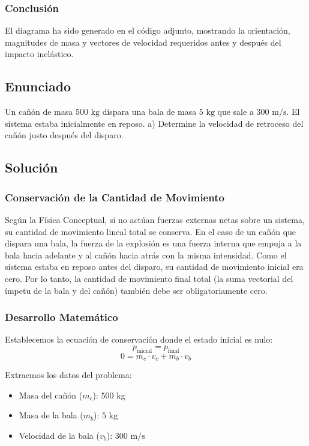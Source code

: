 \documentclass{article}
\begin{document}
\subsubsection*{Conclusión}
El diagrama ha sido generado en el código adjunto, mostrando la orientación, magnitudes de masa y vectores de velocidad requeridos antes y después del impacto inelástico.

\newpage

\subsection*{Enunciado}
Un cañón de masa $500 \text{ kg}$ dispara una bala de masa $5 \text{ kg}$ que sale a $300 \text{ m/s}$. El sistema estaba inicialmente en reposo.
a) Determine la velocidad de retroceso del cañón justo después del disparo.

\subsection*{Solución}

\subsubsection*{Conservación de la Cantidad de Movimiento}
Según la Física Conceptual, si no actúan fuerzas externas netas sobre un sistema, su cantidad de movimiento lineal total se conserva. En el caso de un cañón que dispara una bala, la fuerza de la explosión es una fuerza interna que empuja a la bala hacia adelante y al cañón hacia atrás con la misma intensidad. Como el sistema estaba en reposo antes del disparo, su cantidad de movimiento inicial era cero. Por lo tanto, la cantidad de movimiento final total (la suma vectorial del ímpetu de la bala y del cañón) también debe ser obligatoriamente cero.

\subsubsection*{Desarrollo Matemático}
Establecemos la ecuación de conservación donde el estado inicial es nulo:
$$p_{\text{inicial}} = p_{\text{final}}$$
$$0 = m_c \cdot v_c + m_b \cdot v_b$$

Extraemos los datos del problema:
\begin{itemize}
    \item Masa del cañón ($m_c$): $500 \text{ kg}$
    \item Masa de la bala ($m_b$): $5 \text{ kg}$
    \item Velocidad de la bala ($v_b$): $300 \text{ m/s}$
\end{itemize}
\end{document}
